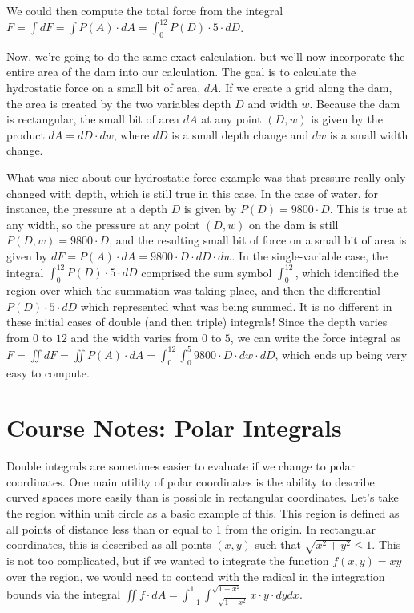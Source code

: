 \documentclass{ximera}
\begin{document}
We could then compute the total force from the integral $F=\int dF=\int P(A)\cdot dA=\int_0^{12}P(D)\cdot5\cdot dD$.

Now, we're going to do the same exact calculation, but we'll now incorporate the entire area of the dam into our calculation. The goal is to calculate the hydrostatic force on a small bit of area, $dA$. If we create a grid along the dam, the area is created by the two variables depth $D$ and width $w$. Because the dam is rectangular, the small bit of area $dA$ at any point $(D,w)$ is given by the product $dA=dD\cdot dw$, where $dD$ is a small depth change and $dw$ is a small width change.

What was nice about our hydrostatic force example was that pressure really only changed with depth, which is still true in this case. In the case of water, for instance, the pressure at a depth $D$ is given by $P(D)=9800\cdot D$. This is true at any width, so the pressure at any point $(D,w)$ on the dam is still $P(D,w)=9800\cdot D$, and the resulting small bit of force on a small bit of area is given by $dF=P(A)\cdot dA=9800\cdot D\cdot dD\cdot dw$. In the single-variable case, the integral $\int_0^{12}P(D)\cdot5\cdot dD$ comprised the sum symbol $\int_0^{12}$, which identified the region over which the summation was taking place, and then the differential $P(D)\cdot5\cdot dD$ which represented what was being summed. It is no different in these initial cases of double (and then triple) integrals! Since the depth varies from $0$ to $12$ and the width varies from $0$ to $5$, we can write the force integral as $F=\iint dF=\iint P(A)\cdot dA=\int_0^{12}\int_0^5 9800\cdot D\cdot dw\cdot dD$, which ends up being very easy to compute.


\section{Course Notes: Polar Integrals}

Double integrals are sometimes easier to evaluate if we change to polar coordinates. One main utility of polar coordinates is the ability to describe curved spaces more easily than is possible in rectangular coordinates. Let's take the region within unit circle as a basic example of this. This region is defined as all points of distance less than or equal to 1 from the origin. In rectangular coordinates, this is described as all points $(x,y)$ such that $\sqrt{x^2+y^2}\leq 1$. This is not too complicated, but if we wanted to integrate the function $f(x,y)=xy$ over the region, we would need to contend with the radical in the integration bounds via the integral $\iint f\cdot dA=\int_{-1}^1\int_{-\sqrt{1-x^2}}^{\sqrt{1-x^2}} x\cdot y\cdot  dy dx$.
\end{document}
